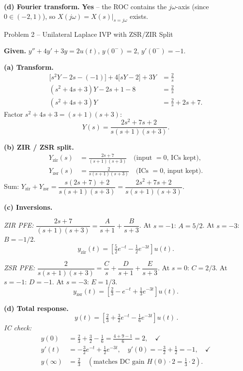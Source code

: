 \documentclass[11pt]{article}
\begin{document}
\textbf{(d) Fourier transform.} \textbf{Yes} -- the ROC contains the $j\omega$-axis (since $0\in(-2,1)$), so $X(j\omega) = X(s)\big|_{s=j\omega}$ exists.

\vspace{10pt}

\begin{problembox}{Problem 2 -- Unilateral Laplace IVP with ZSR/ZIR Split}
\end{problembox}

\textbf{Given.} $y'' + 4y' + 3y = 2u(t)$, $y(0^-)=2$, $y'(0^-)=-1$.

\textbf{(a) Transform.}
\begin{align*}
\bigl[s^2 Y - 2s - (-1)\bigr] + 4\bigl[sY - 2\bigr] + 3Y &= \frac{2}{s}\\
(s^2+4s+3)Y - 2s + 1 - 8 &= \frac{2}{s}\\
(s^2+4s+3)Y &= \frac{2}{s} + 2s + 7.
\end{align*}
Factor $s^2+4s+3 = (s+1)(s+3)$:
\[
Y(s) = \frac{2s^2+7s+2}{s(s+1)(s+3)}.
\]

\textbf{(b) ZIR / ZSR split.}
\begin{align*}
Y_{\text{zir}}(s) &= \frac{2s+7}{(s+1)(s+3)} \quad\text{(input $= 0$, ICs kept)},\\
Y_{\text{zsr}}(s) &= \frac{2}{s(s+1)(s+3)} \quad\text{(ICs $= 0$, input kept)}.
\end{align*}
Sum: $Y_{\text{zir}} + Y_{\text{zsr}} = \dfrac{s(2s+7) + 2}{s(s+1)(s+3)} = \dfrac{2s^2+7s+2}{s(s+1)(s+3)}.$ \checkmark

\textbf{(c) Inversions.}

\textit{ZIR PFE:} $\dfrac{2s+7}{(s+1)(s+3)} = \dfrac{A}{s+1} + \dfrac{B}{s+3}$. At $s=-1$: $A = 5/2$. At $s=-3$: $B = -1/2$.
\[
y_{\text{zir}}(t) = \left[\tfrac{5}{2}e^{-t} - \tfrac{1}{2}e^{-3t}\right]u(t).
\]

\textit{ZSR PFE:} $\dfrac{2}{s(s+1)(s+3)} = \dfrac{C}{s}+\dfrac{D}{s+1}+\dfrac{E}{s+3}$. At $s=0$: $C=2/3$. At $s=-1$: $D=-1$. At $s=-3$: $E=1/3$.
\[
y_{\text{zsr}}(t) = \left[\tfrac{2}{3} - e^{-t} + \tfrac{1}{3}e^{-3t}\right]u(t).
\]

\textbf{(d) Total response.}
\[
\boxed{\,y(t) = \left[\tfrac{2}{3} + \tfrac{3}{2}e^{-t} - \tfrac{1}{6}e^{-3t}\right]u(t)\,.}
\]
\textit{IC check:}
\begin{align*}
y(0) &= \tfrac{2}{3} + \tfrac{3}{2} - \tfrac{1}{6} = \tfrac{4+9-1}{6} = 2,\quad \checkmark\\
y'(t) &= -\tfrac{3}{2}e^{-t} + \tfrac{1}{2}e^{-3t},\quad y'(0) = -\tfrac{3}{2} + \tfrac{1}{2} = -1,\quad \checkmark\\
y(\infty) &= \tfrac{2}{3}\quad (\text{matches DC gain } H(0)\cdot 2 = \tfrac{1}{3}\cdot 2).
\end{align*}
\end{document}
